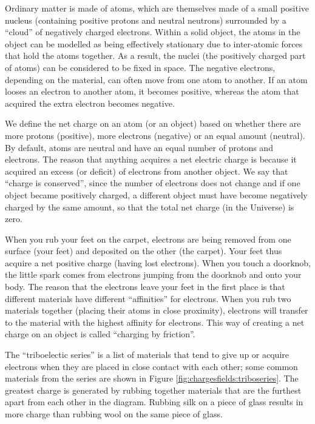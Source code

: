 Ordinary matter is made of atoms, which are themselves made of a small positive nucleus (containing positive protons and neutral neutrons) surrounded by a ``cloud'' of negatively charged electrons. Within a solid object, the atoms in the object can be modelled as being effectively stationary due to inter-atomic forces that hold the atoms together. As a result, the nuclei (the positively charged part of atoms) can be considered to be fixed in space. The negative electrons, depending on the material, can often move from one atom to another. If an atom looses an electron to another atom, it becomes positive, whereas the atom that acquired the extra electron becomes negative.

We define the net charge on an atom (or an object) based on whether there are more protons (positive), more electrons (negative) or an equal amount (neutral). By default, atoms are neutral and have an equal number of protons and electrons. The reason that anything acquires a net electric charge is because it acquired an excess (or deficit) of electrons from another object. We say that ``charge is conserved'', since the number of electrons does not change and if one object became positively charged, a different object must have become negatively charged by the same amount, so that the total net charge (in the Universe) is zero.

When you rub your feet on the carpet, electrons are being removed from one surface (your feet) and deposited on the other (the carpet). Your feet thus acquire a net positive charge (having lost electrons). When you touch a doorknob, the little spark comes from electrons jumping from the doorknob and onto your body. The reason that the electrons leave your feet in the first place is that different materials have different ``affinities'' for electrons. When you rub two materials together (placing their atoms in close proximity), electrons will transfer to the material with the highest affinity for electrons. This way of creating a net charge on an object is called ``charging by friction''.

The ``triboelectic series'' is a list of materials that tend to give up or acquire electrons when they are placed in close contact with each other; some common materials from the series are shown in Figure \ref{fig:chargesfields:triboseries}.  The greatest charge is generated by rubbing together materials that are the furthest apart from each other in the diagram. Rubbing silk on a piece of glass results in more charge than rubbing wool on the same piece of glass.

